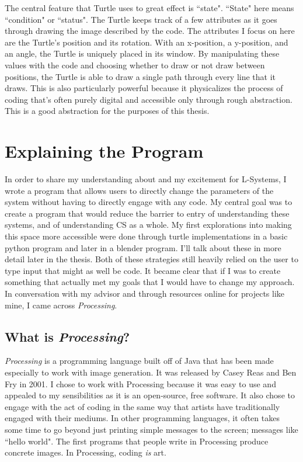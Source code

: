 \documentclass[12pt,twoside]{reedthesis}
\begin{document}
	The central feature that Turtle uses to great effect is ``state". ``State" here means ``condition" or ``status". The Turtle keeps track of a few attributes as it goes through drawing the image described by the code. The attributes I focus on here are the Turtle's position and its rotation. With an x-position, a y-position, and an angle, the Turtle is uniquely placed in its window. By manipulating these values with the code and choosing whether to draw or not draw between positions, the Turtle is able to draw a single path through every line that it draws. This is also particularly powerful because it physicalizes the process of coding that's often purely digital and accessible only through rough abstraction. This is a good abstraction for the purposes of this thesis.\\


\chapter{Explaining the Program}

	In order to share my understanding about and my excitement for L-Systems, I wrote a program that allows users to directly change the parameters of the system without having to directly engage with any code. My central goal was to create a program that would reduce the barrier to entry of understanding these systems, and of understanding CS as a whole. My first explorations into making this space more accessible were done through turtle implementations in a basic python program and later in a blender program. I'll talk about these in more detail later in the thesis. Both of these strategies still heavily relied on the user to type input that might as well be code. It became clear that if I was to create something that actually met my goals that I would have to change my approach. In conversation with my advisor and through resources online for projects like mine, I came across \textit{Processing}.\\

\section{What is \textit{Processing}?}

	\textit{Processing} is a programming language built off of Java that has been made especially to work with image generation. It was released by Casey Reas and Ben Fry in 2001. I chose to work with Processing because it was easy to use and appealed to my sensibilities as it is an open-source, free software. It also chose to engage with the act of coding in the same way that artists have traditionally engaged with their mediums. In other programming languages, it often takes some time to go beyond just printing simple messages to the screen; messages like ``hello world". The first programs that people write in Processing produce concrete images. In Processing, coding \textit{is} art. \\
	
\end{document}
